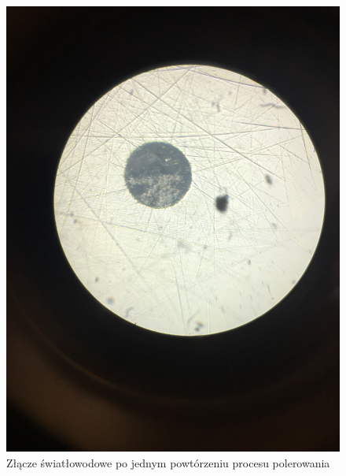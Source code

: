 \documentclass[12pt, a4paper, oneside]{article}
\begin{document}
\begin{figure}[b]
\centering
\caption{Złącze światłowodowe po jednym powtórzeniu procesu polerowania}
\includegraphics[scale=0.1]{m6.jpg}
\end{figure}
\clearpage
\end{document}
